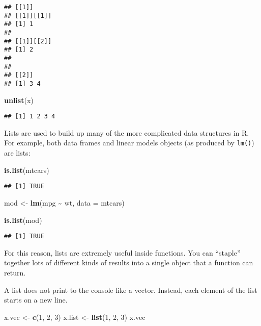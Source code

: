\documentclass[
]{book}
\newenvironment{Shaded}{\begin{snugshade}}{\end{snugshade}}
\newcommand{\DataTypeTok}[1]{\textcolor[rgb]{0.13,0.29,0.53}{#1}}
\newcommand{\DecValTok}[1]{\textcolor[rgb]{0.00,0.00,0.81}{#1}}
\newcommand{\KeywordTok}[1]{\textcolor[rgb]{0.13,0.29,0.53}{\textbf{#1}}}
\newcommand{\NormalTok}[1]{#1}
\newcommand{\OperatorTok}[1]{\textcolor[rgb]{0.81,0.36,0.00}{\textbf{#1}}}
\newcommand{\StringTok}[1]{\textcolor[rgb]{0.31,0.60,0.02}{#1}}
\begin{document}
\begin{verbatim}
## [[1]]
## [[1]][[1]]
## [1] 1
## 
## [[1]][[2]]
## [1] 2
## 
## 
## [[2]]
## [1] 3 4
\end{verbatim}

\begin{Shaded}
\begin{Highlighting}[]
\KeywordTok{unlist}\NormalTok{(x)}
\end{Highlighting}
\end{Shaded}

\begin{verbatim}
## [1] 1 2 3 4
\end{verbatim}

Lists are used to build up many of the more complicated data structures in R. For example, both data frames and linear models objects (as produced by \texttt{lm()}) are lists:

\begin{Shaded}
\begin{Highlighting}[]
\KeywordTok{is.list}\NormalTok{(mtcars)}
\end{Highlighting}
\end{Shaded}

\begin{verbatim}
## [1] TRUE
\end{verbatim}

\begin{Shaded}
\begin{Highlighting}[]
\NormalTok{mod \textless{}{-}}\StringTok{ }\KeywordTok{lm}\NormalTok{(mpg }\OperatorTok{\textasciitilde{}}\StringTok{ }\NormalTok{wt, }\DataTypeTok{data =}\NormalTok{ mtcars)}

\KeywordTok{is.list}\NormalTok{(mod)}
\end{Highlighting}
\end{Shaded}

\begin{verbatim}
## [1] TRUE
\end{verbatim}

For this reason, lists are extremely useful inside functions. You can ``staple'' together lots of different kinds of results into a single object that a function can return.

A list does not print to the console like a vector. Instead, each element of the list starts on a new line.

\begin{Shaded}
\begin{Highlighting}[]
\NormalTok{x.vec \textless{}{-}}\StringTok{ }\KeywordTok{c}\NormalTok{(}\DecValTok{1}\NormalTok{, }\DecValTok{2}\NormalTok{, }\DecValTok{3}\NormalTok{)}
\NormalTok{x.list \textless{}{-}}\StringTok{ }\KeywordTok{list}\NormalTok{(}\DecValTok{1}\NormalTok{, }\DecValTok{2}\NormalTok{, }\DecValTok{3}\NormalTok{)}
\NormalTok{x.vec}
\end{Highlighting}
\end{Shaded}
\end{document}
